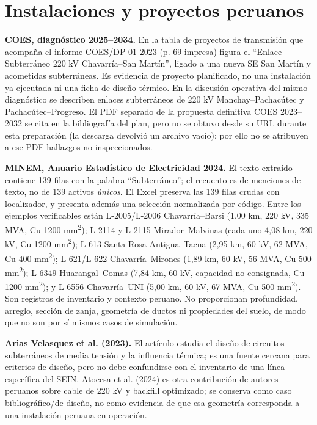 \documentclass[11pt,a4paper,oneside]{report}
\begin{document}
\chapter*{Instalaciones y proyectos peruanos}
\textbf{COES, diagn\'ostico 2025--2034.} En la tabla de proyectos de transmisi\'on que acompa\~na el informe COES/DP-01-2023 (p. 69 impresa) figura el ``Enlace Subterr\'aneo 220 kV Chavarr\'ia--San Mart\'in'', ligado a una nueva SE San Mart\'in y acometidas subterr\'aneas. Es evidencia de proyecto planificado, no una instalaci\'on ya ejecutada ni una ficha de dise\~no t\'ermico. En la discusi\'on operativa del mismo diagn\'ostico se describen enlaces subterr\'aneos de 220 kV Manchay--Pachac\'utec y Pachac\'utec--Progreso. El PDF separado de la propuesta definitiva COES 2023--2032 se cita en la bibliograf\'ia del plan, pero no se obtuvo desde su URL durante esta preparaci\'on (la descarga devolvi\'o un archivo vac\'io); por ello no se atribuyen a ese PDF hallazgos no inspeccionados.

\textbf{MINEM, Anuario Estad\'istico de Electricidad 2024.} El texto extra\'ido contiene 139 filas con la palabra ``Subterr\'aneo''; el recuento es de menciones de texto, no de 139 activos \emph{\'unicos}. El Excel preserva las 139 filas crudas con localizador, y presenta adem\'as una selecci\'on normalizada por c\'odigo. Entre los ejemplos verificables est\'an L-2005/L-2006 Chavarr\'ia--Barsi (1,00 km, 220 kV, 335 MVA, Cu 1200 mm\textsuperscript{2}); L-2114 y L-2115 Mirador--Malvinas (cada uno 4,08 km, 220 kV, Cu 1200 mm\textsuperscript{2}); L-613 Santa Rosa Antigua--Tacna (2,95 km, 60 kV, 62 MVA, Cu 400 mm\textsuperscript{2}); L-621/L-622 Chavarr\'ia--Mirones (1,89 km, 60 kV, 56 MVA, Cu 500 mm\textsuperscript{2}); L-6349 Huarangal--Comas (7,84 km, 60 kV, capacidad no consignada, Cu 1200 mm\textsuperscript{2}); y L-6556 Chavarr\'ia--UNI (5,00 km, 60 kV, 67 MVA, Cu 500 mm\textsuperscript{2}). Son registros de inventario y contexto peruano. No proporcionan profundidad, arreglo, secci\'on de zanja, geometr\'ia de ductos ni propiedades del suelo, de modo que no son por s\'i mismos casos de simulaci\'on.

\textbf{Arias Velasquez et al. (2023).} El art\'iculo estudia el dise\~no de circuitos subterr\'aneos de media tensi\'on y la influencia t\'ermica; es una fuente cercana para criterios de dise\~no, pero no debe confundirse con el inventario de una l\'inea espec\'ifica del SEIN. Atoccsa et al. (2024) es otra contribuci\'on de autores peruanos sobre cable de 220 kV y backfill optimizado; se conserva como caso bibliogr\'afico/de dise\~no, no como evidencia de que esa geometr\'ia corresponda a una instalaci\'on peruana en operaci\'on.
\end{document}
